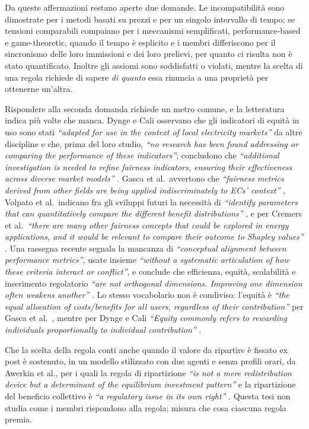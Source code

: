 Da queste affermazioni restano aperte due domande. Le incompatibilità sono dimostrate per i metodi basati su prezzi e per un singolo intervallo di tempo; se tensioni comparabili compaiano per i meccanismi semplificati, performance-based e game-theoretic, quando il tempo è esplicito e i membri differiscono per il sincronismo delle loro immissioni e dei loro prelievi, per quanto ci risulta non è stato quantificato. Inoltre gli assiomi sono soddisfatti o violati, mentre la scelta di una regola richiede di sapere \emph{di quanto} essa rinuncia a una proprietà per ottenerne un'altra.

Rispondere alla seconda domanda richiede un metro comune, e la letteratura indica più volte che manca. Dynge e Cali osservano che gli indicatori di equità in uso sono stati \textit{``adapted for use in the context of local electricity markets''} da altre discipline e che, prima del loro studio, \textit{``no research has been found addressing or comparing the performance of these indicators''}; concludono che \textit{``additional investigation is needed to refine fairness indicators, ensuring their effectiveness across diverse market models''} \cite{dynge2025}. Gasca et al.\ avvertono che \textit{``fairness metrics derived from other fields are being applied indiscriminately to ECs' context''} \cite{gasca2024}, Volpato et al.\ indicano fra gli sviluppi futuri la necessità di \textit{``identify parameters that can quantitatively compare the different benefit distributions''} \cite{volpato2024}, e per Cremers et al.\ \textit{``there are many other fairness concepts that could be explored in energy applications, and it would be relevant to compare their outcome to Shapley values''} \cite{cremers2023}. Una rassegna recente segnala la mancanza di \textit{``conceptual alignment between performance metrics''}, usate insieme \textit{``without a systematic articulation of how these criteria interact or conflict''}, e conclude che efficienza, equità, scalabilità e inserimento regolatorio \textit{``are not orthogonal dimensions. Improving one dimension often weakens another''} \cite{chatel2026}. Lo stesso vocabolario non è condiviso: l'equità è \textit{``the equal allocation of costs/benefits for all users, regardless of their contribution''} per Gasca et al.\ \cite{gasca2024}, mentre per Dynge e Cali \textit{``Equity commonly refers to rewarding individuals proportionally to individual contribution''} \cite{dynge2025}.

Che la scelta della regola conti anche quando il valore da ripartire è fissato ex post è sostenuto, in un modello stilizzato con due agenti e senza profili orari, da Awerkin et al., per i quali la regola di ripartizione \textit{``is not a mere redistribution device but a determinant of the equilibrium investment pattern''} e la ripartizione del beneficio collettivo è \textit{``a regulatory issue in its own right''} \cite{awerkin2026}. Questa tesi non studia come i membri rispondono alla regola; misura che cosa ciascuna regola premia.

